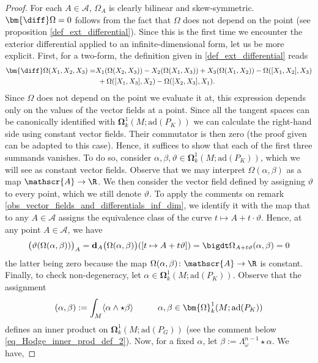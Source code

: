 \begin{proof}
    For each \(A \in \mathscr{A}\), \(\Omega_A\) is clearly bilinear and skew-symmetric. \(\bm{\diff} \Omega=0\) follows from the fact that \(\Omega\) does not depend on the point (see proposition \ref{def_ext_differential}). Since this is the first time we encounter the exterior differential applied to an infinite-dimensional form, let us be more explicit. First, for a two-form, the definition given in \eqref{def_ext_differential} reads
    \begin{align*}
        \bm{\diff} \Omega(X_1, X_2, X_3)  = & X_1(\Omega(X_2, X_3)) - X_2(\Omega(X_1, X_3))+X_3(\Omega(X_1, X_2)) - \Omega([X_1, X_2], X_3) \\
        & \ + \Omega([X_1, X_3], X_2) - \Omega([X_2, X_3], X_1).
    \end{align*}    
    Since \(\Omega\) does not depend on the point we evaluate it at, this expression depends only on the values of the vector fields at a point. Since all the tangent spaces can be canonically identified with \(\bm{\Omega}_k^1(M; \mathrm{ad}(P_K))\) we can calculate the right-hand side using constant vector fields. Their commutator is then zero (the proof given \parencite[Prop. 2.6]{LarsMartin_Notes_HK} can be adapted to this case). Hence, it suffices to show that each of the first three summands vanishes. To do so, consider \(\alpha, \beta ,\vartheta \in \bm{\Omega}_k^1(M; \mathrm{ad}(P_K))\), which we will see as constant vector fields. Observe that we may interpret \(\Omega(\alpha, \beta)\) as a map \(\mathscr{A} \to \R\). We then consider the vector field defined by assigning \(\vartheta\) to every point, which we still denote \(\vartheta\). To apply the comments on remark \ref{obs_vector_fields_and_differentials_inf_dim}, we identify it with the map that to any \(A \in \mathscr{A}\) assigns the equivalence class of the curve \(t \mapsto A+t \cdot \vartheta\). Hence, at any point \(A \in \mathscr{A}\), we have
    \[
    \big(\vartheta(\Omega(\alpha, \beta))\big)_A=\mathbf{d}_A \big(\Omega(\alpha, \beta)\big)([t \mapsto A+ t\vartheta])=\bigdt \Omega_{A+t\vartheta}(\alpha, \beta)=0
    \] 
    the latter being zero because the map \(\Omega(\alpha, \beta)\colon \mathscr{A}\to \R\) is constant. Finally, to check non-degeneracy, let \(\alpha \in \bm{\Omega}^1_k(M;\mathrm{ad}(P_K))\). Observe that the assignment 
    \[
    (\alpha, \beta):=\int_M \langle \alpha \wedge \star \beta \rangle \hspace{1 cm} \alpha, \beta \in \bm{\Omega}^1_k(M; \mathrm{ad}(P_K))
    \]
    defines an inner product on \(\bm{\Omega}^1_k(M; \mathrm{ad}(P_G))\) (see the comment below \eqref{eq_Hodge_inner_prod_def_2}). Now, for a fixed \(\alpha\), let \(\beta:=\Lambda_\omega^{n-1} \star\alpha\). We have,

\end{proof}
